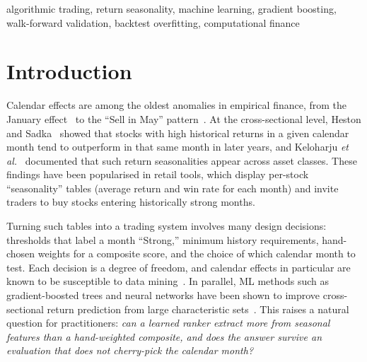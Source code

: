 \documentclass[conference]{IEEEtran}
\begin{document}
\begin{IEEEkeywords}
algorithmic trading, return seasonality, machine learning, gradient boosting, walk-forward validation, backtest overfitting, computational finance
\end{IEEEkeywords}

\section{Introduction}

Calendar effects are among the oldest anomalies in empirical finance, from the January effect~\cite{rozeff1976} to the ``Sell in May'' pattern~\cite{bouman2002}. At the cross-sectional level, Heston and Sadka~\cite{heston2008} showed that stocks with high historical returns in a given calendar month tend to outperform in that same month in later years, and Keloharju \emph{et al.}~\cite{keloharju2016} documented that such return seasonalities appear across asset classes. These findings have been popularised in retail tools, which display per-stock ``seasonality'' tables (average return and win rate for each month) and invite traders to buy stocks entering historically strong months.

Turning such tables into a trading system involves many design decisions: thresholds that label a month ``Strong,'' minimum history requirements, hand-chosen weights for a composite score, and the choice of which calendar month to test. Each decision is a degree of freedom, and calendar effects in particular are known to be susceptible to data mining~\cite{sullivan2001}. In parallel, ML methods such as gradient-boosted trees and neural networks have been shown to improve cross-sectional return prediction from large characteristic sets~\cite{gu2020,krauss2017}. This raises a natural question for practitioners: \emph{can a learned ranker extract more from seasonal features than a hand-weighted composite, and does the answer survive an evaluation that does not cherry-pick the calendar month?}
\end{document}
